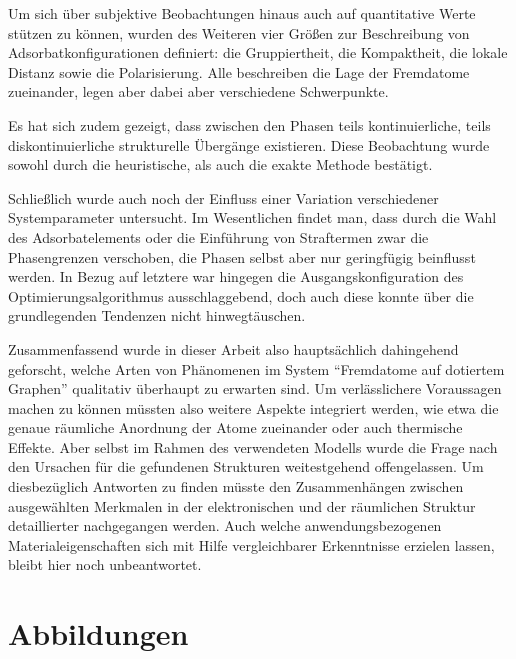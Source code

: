 \documentclass[a4paper, 10pt, twoside, openany]{book} %
\begin{document}
	Um sich über subjektive Beobachtungen hinaus auch auf quantitative Werte stützen zu können, wurden des Weiteren vier Größen zur Beschreibung von Adsorbatkonfigurationen definiert: die Gruppiertheit, die Kompaktheit, die lokale Distanz sowie die Polarisierung. Alle beschreiben die Lage der Fremdatome zueinander, legen aber dabei aber verschiedene Schwerpunkte.
	
	Es hat sich zudem gezeigt, dass zwischen den Phasen teils kontinuierliche, teils diskontinuierliche strukturelle Übergänge existieren. Diese Beobachtung wurde sowohl durch die heuristische, als auch die exakte Methode bestätigt.
	
	Schließlich wurde auch noch der Einfluss einer Variation verschiedener Systemparameter untersucht. Im Wesentlichen findet man, dass durch die Wahl des Adsorbatelements oder die Einführung von Straftermen zwar die Phasengrenzen verschoben, die Phasen selbst aber nur geringfügig beinflusst werden. In Bezug auf letztere war hingegen die Ausgangskonfiguration des Optimierungsalgorithmus ausschlaggebend, doch auch diese konnte über die grundlegenden Tendenzen nicht hinwegtäuschen.
	
	Zusammenfassend wurde in dieser Arbeit also hauptsächlich dahingehend geforscht, welche Arten von Phänomenen im System "`Fremdatome auf dotiertem Graphen"' qualitativ überhaupt zu erwarten sind. Um verlässlichere Voraussagen machen zu können müssten also weitere Aspekte integriert werden, wie etwa die genaue räumliche Anordnung der Atome zueinander oder auch thermische Effekte. Aber selbst im Rahmen des verwendeten Modells wurde die Frage nach den Ursachen für die gefundenen Strukturen weitestgehend offengelassen. Um diesbezüglich Antworten zu finden müsste den Zusammenhängen zwischen ausgewählten Merkmalen in der elektronischen und der räumlichen Struktur detaillierter nachgegangen werden. Auch welche anwendungsbezogenen Materialeigenschaften sich mit Hilfe vergleichbarer Erkenntnisse erzielen lassen, bleibt hier noch unbeantwortet.
	
	\appendix
	
	\chapter{Abbildungen}
	
\end{document}
